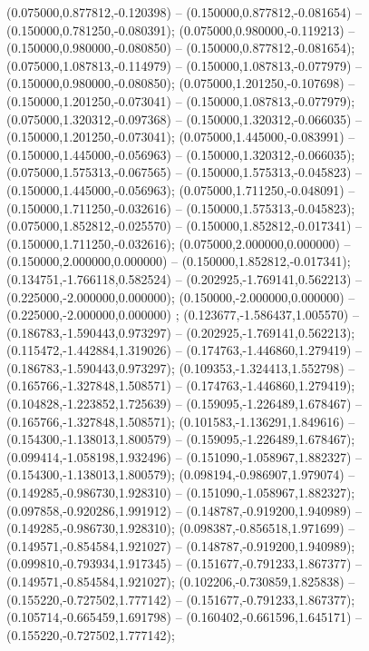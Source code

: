  (0.075000,0.877812,-0.120398) -- (0.150000,0.877812,-0.081654) -- (0.150000,0.781250,-0.080391);
 (0.075000,0.980000,-0.119213) -- (0.150000,0.980000,-0.080850) -- (0.150000,0.877812,-0.081654);
 (0.075000,1.087813,-0.114979) -- (0.150000,1.087813,-0.077979) -- (0.150000,0.980000,-0.080850);
 (0.075000,1.201250,-0.107698) -- (0.150000,1.201250,-0.073041) -- (0.150000,1.087813,-0.077979);
 (0.075000,1.320312,-0.097368) -- (0.150000,1.320312,-0.066035) -- (0.150000,1.201250,-0.073041);
 (0.075000,1.445000,-0.083991) -- (0.150000,1.445000,-0.056963) -- (0.150000,1.320312,-0.066035);
 (0.075000,1.575313,-0.067565) -- (0.150000,1.575313,-0.045823) -- (0.150000,1.445000,-0.056963);
 (0.075000,1.711250,-0.048091) -- (0.150000,1.711250,-0.032616) -- (0.150000,1.575313,-0.045823);
 (0.075000,1.852812,-0.025570) -- (0.150000,1.852812,-0.017341) -- (0.150000,1.711250,-0.032616);
 (0.075000,2.000000,0.000000) -- (0.150000,2.000000,0.000000) -- (0.150000,1.852812,-0.017341);
 (0.134751,-1.766118,0.582524) -- (0.202925,-1.769141,0.562213) -- (0.225000,-2.000000,0.000000);
 (0.150000,-2.000000,0.000000) -- (0.225000,-2.000000,0.000000) ;
 (0.123677,-1.586437,1.005570) -- (0.186783,-1.590443,0.973297) -- (0.202925,-1.769141,0.562213);
 (0.115472,-1.442884,1.319026) -- (0.174763,-1.446860,1.279419) -- (0.186783,-1.590443,0.973297);
 (0.109353,-1.324413,1.552798) -- (0.165766,-1.327848,1.508571) -- (0.174763,-1.446860,1.279419);
 (0.104828,-1.223852,1.725639) -- (0.159095,-1.226489,1.678467) -- (0.165766,-1.327848,1.508571);
 (0.101583,-1.136291,1.849616) -- (0.154300,-1.138013,1.800579) -- (0.159095,-1.226489,1.678467);
 (0.099414,-1.058198,1.932496) -- (0.151090,-1.058967,1.882327) -- (0.154300,-1.138013,1.800579);
 (0.098194,-0.986907,1.979074) -- (0.149285,-0.986730,1.928310) -- (0.151090,-1.058967,1.882327);
 (0.097858,-0.920286,1.991912) -- (0.148787,-0.919200,1.940989) -- (0.149285,-0.986730,1.928310);
 (0.098387,-0.856518,1.971699) -- (0.149571,-0.854584,1.921027) -- (0.148787,-0.919200,1.940989);
 (0.099810,-0.793934,1.917345) -- (0.151677,-0.791233,1.867377) -- (0.149571,-0.854584,1.921027);
 (0.102206,-0.730859,1.825838) -- (0.155220,-0.727502,1.777142) -- (0.151677,-0.791233,1.867377);
 (0.105714,-0.665459,1.691798) -- (0.160402,-0.661596,1.645171) -- (0.155220,-0.727502,1.777142);
